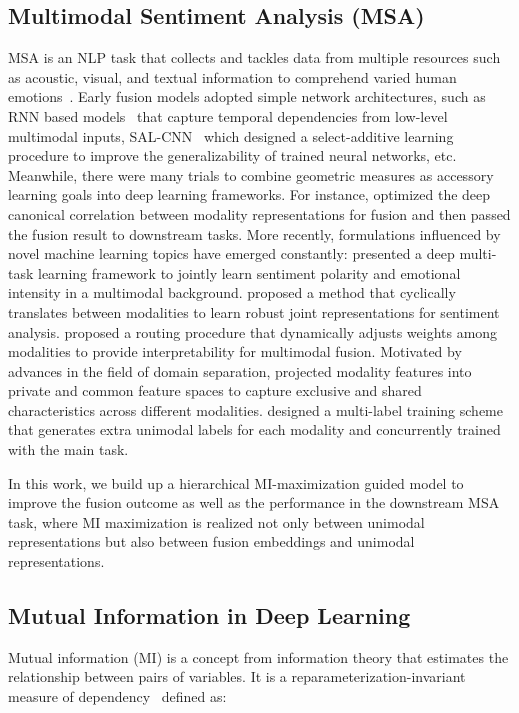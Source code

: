 \documentclass[11pt]{article}
\newcommand{\mv}{visual}
\newcommand{\ma}{acoustic}
\begin{document}
\subsection{Multimodal Sentiment Analysis (MSA)}
MSA is an NLP task that collects and tackles data from multiple resources such as \ma, \mv, and textual information to comprehend varied human emotions~\citep{morency2011towards}.
Early fusion models adopted simple network architectures, such as RNN based models~\citep{wollmer2013youtube,chen2017multimodal} that capture temporal dependencies from low-level multimodal inputs, SAL-CNN~\citep{wang2017select} which designed a select-additive learning procedure to improve the generalizability of trained neural networks, etc. 
Meanwhile, there were many trials to combine geometric measures as accessory learning goals into deep learning frameworks.
For instance, \citet{hazarika2018cascade, sun2020learning} optimized the deep canonical correlation between modality representations for fusion and then passed the fusion result to downstream tasks.
More recently, formulations influenced by novel machine learning topics have emerged constantly:
\citet{akhtar2019multi} presented a deep multi-task learning framework to jointly learn sentiment polarity and emotional intensity in a multimodal background.
\citet{pham2019found} proposed a method that cyclically translates between modalities to learn robust joint representations for sentiment analysis. 
\citet{tsai2020multimodal} proposed a routing procedure that dynamically adjusts weights among modalities to provide interpretability for multimodal fusion.
Motivated by advances in the field of domain separation, \citet{hazarika2020misa} projected modality features into private and common feature spaces to capture exclusive and shared characteristics across different modalities.
\citet{yu2021learning} designed a multi-label training scheme that generates extra unimodal labels for each modality and concurrently trained with the main task.
\par
In this work, we build up a hierarchical MI-maximization guided model to improve the fusion outcome as well as the performance in the downstream MSA task, where MI maximization is realized not only between unimodal representations but also between fusion embeddings and unimodal representations.

\subsection{Mutual Information in Deep Learning}
Mutual information (MI) is a concept from information theory that estimates the relationship between pairs of variables. It is a reparameterization-invariant measure of dependency~\citep{tishby2015deep} defined as:
\end{document}
